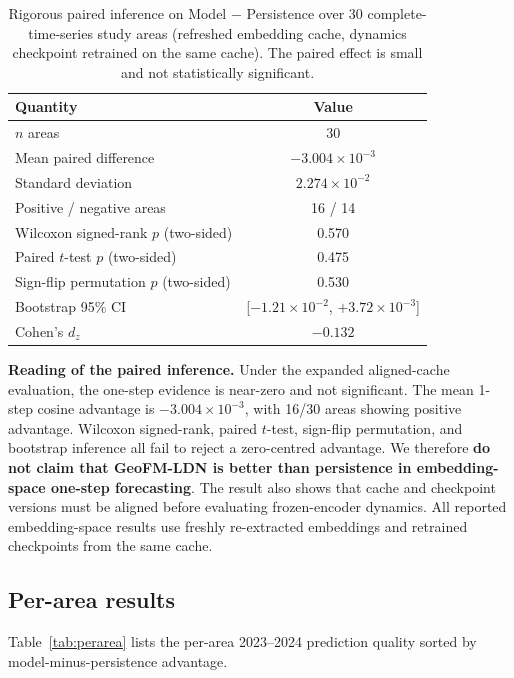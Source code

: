 \documentclass{article}
\begin{document}
\begin{table}[htbp]
\centering
\caption{Rigorous paired inference on Model $-$ Persistence over 30 complete-time-series study areas (refreshed embedding cache, dynamics checkpoint retrained on the same cache). The paired effect is small and not statistically significant.}
\label{tab:paired_inference}
\small
\begin{tabular}{lc}
\toprule
Quantity & Value \\
\midrule
$n$ areas & 30 \\
Mean paired difference & $-3.004 \times 10^{-3}$ \\
Standard deviation & $2.274 \times 10^{-2}$ \\
Positive / negative areas & 16 / 14 \\
Wilcoxon signed-rank $p$ (two-sided) & 0.570 \\
Paired $t$-test $p$ (two-sided) & 0.475 \\
Sign-flip permutation $p$ (two-sided) & 0.530 \\
Bootstrap 95\% CI & [$-1.21\times10^{-2}$, $+3.72\times10^{-3}$] \\
Cohen's $d_z$ & $-0.132$ \\
\bottomrule
\end{tabular}
\end{table}

\textbf{Reading of the paired inference.} Under the expanded aligned-cache evaluation, the one-step evidence is near-zero and not significant. The mean 1-step cosine advantage is $-3.004\times10^{-3}$, with 16/30 areas showing positive advantage. Wilcoxon signed-rank, paired $t$-test, sign-flip permutation, and bootstrap inference all fail to reject a zero-centred advantage. We therefore \textbf{do not claim that GeoFM-LDN is better than persistence in embedding-space one-step forecasting}. The result also shows that cache and checkpoint versions must be aligned before evaluating frozen-encoder dynamics. All reported embedding-space results use freshly re-extracted embeddings and retrained checkpoints from the same cache.

\subsection{Per-area results}

Table~\ref{tab:perarea} lists the per-area 2023--2024 prediction quality sorted by model-minus-persistence advantage.
\end{document}
